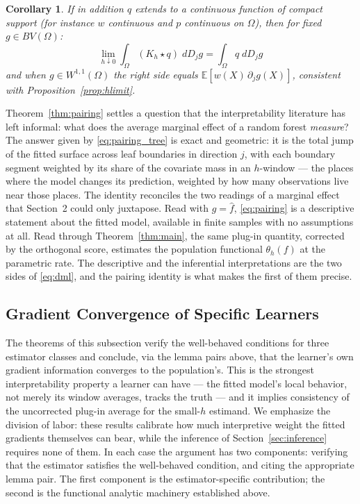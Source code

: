 \documentclass[12pt]{article}
\newtheorem{corollary}{Corollary}
\newcommand{\E}{\mathbb{E}}
\newcommand{\BV}{BV(\Omega)}
\begin{document}
	\begin{corollary}
		\label{cor:pairing_limit}
		If in addition $q$ extends to a continuous function of compact support (for
		instance $w$ continuous and $p$ continuous on $\Omega$), then for fixed
		$g \in \BV$:
		\begin{equation}
			\lim_{h \downarrow 0} \int_\Omega (K_h \star q)\; dD_j g
			= \int_\Omega q\; dD_j g
		\end{equation}
		and when $g \in W^{1,1}(\Omega)$ the right side equals
		$\E[w(X)\, \partial_j g(X)]$, consistent with
		Proposition~\ref{prop:hlimit}.
	\end{corollary}
	
	Theorem~\ref{thm:pairing} settles a question that the interpretability literature
	has left informal: what does the average marginal effect of a random forest
	\emph{measure}? The answer given by \eqref{eq:pairing_tree} is exact and
	geometric: it is the total jump of the fitted surface across leaf boundaries in
	direction $j$, with each boundary segment weighted by its share of the covariate
	mass in an $h$-window --- the places where the model changes its prediction,
	weighted by how many observations live near those places. The identity reconciles
	the two readings of a marginal effect that Section~2 could only juxtapose. Read
	with $g = \hat{f}$, \eqref{eq:pairing} is a descriptive statement about the fitted
	model, available in finite samples with no assumptions at all. Read through
	Theorem~\ref{thm:main}, the same plug-in quantity, corrected by the orthogonal
	score, estimates the population functional $\theta_h(f)$ at the parametric rate.
	The descriptive and the inferential interpretations are the two sides of
	\eqref{eq:dml}, and the pairing identity is what makes the first of them precise.
	
	\subsection{Gradient Convergence of Specific Learners}
	\label{sec:learners}
	
	The theorems of this subsection verify the well-behaved conditions for three
	estimator classes and conclude, via the lemma pairs above, that the learner's own
	gradient information converges to the population's. This is the strongest
	interpretability property a learner can have --- the fitted model's local behavior,
	not merely its window averages, tracks the truth --- and it implies consistency of
	the uncorrected plug-in average for the small-$h$ estimand. We emphasize the
	division of labor: these results calibrate how much interpretive weight the fitted
	gradients themselves can bear, while the inference of Section~\ref{sec:inference}
	requires none of them. In each case the argument has two components: verifying that
	the estimator satisfies the well-behaved condition, and citing the appropriate
	lemma pair. The first component is the estimator-specific contribution; the second
	is the functional analytic machinery established above.
	
\end{document}
